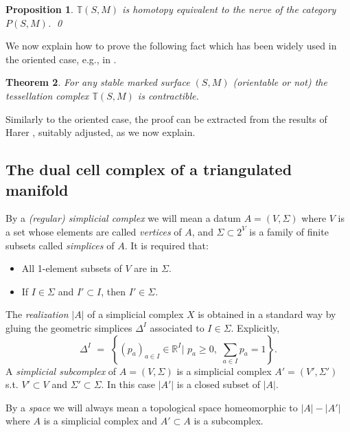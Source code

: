 \documentclass[english,11pt,leqno]{article}
\def\RR{\mathbb{R}}
\def\TT{{\mathbb{T}}}
\newtheorem{thm}{Theorem}[section]
\newtheorem{prop}[thm]{Proposition}
\theoremstyle{definition}
\theoremstyle{remark}
\numberwithin{equation}{section}
\begin{document}
 \begin{prop}\label{prop:tess-graph}
 $\TT(S,M)$ is homotopy equivalent to the nerve of the category $P(S,M)$. 
 \qed
 \end{prop}
 
 We now explain  how to prove the following fact which has been widely used in the oriented case, e.g., in
 \cite {HSS-triangulated, fock-goncharov}. 
 
 \begin{thm}\label{thm:contractible}
	For any stable marked surface $(S,M)$ (orientable or not) the tessellation complex $\TT(S,M)$ is contractible. 
\end{thm}
  
  Similarly to the oriented case, the proof can be extracted from the results of Harer \cite{harer},
  suitably adjusted,  as we now explain. 
 
 
 \subsection {The dual cell complex of a triangulated manifold}
 
 By a {\em (regular) simplicial complex}  we will mean a datum $A=(V,\Sigma)$
 where $V$ is a set whose elements are called {\em vertices} of $A$, and $\Sigma\subset 2^V$
 is a family of finite subsets called {\em simplices} of $A$. It is required that:
 \begin{itemize}
 \item All 1-element subsets of $V$ are in $\Sigma$.
 
 \item If $I\in \Sigma$ and $I'\subset I$, then $I'\in\Sigma$. 
 \end{itemize}
 
 The {\em realization} $|A|$ of a simplicial complex $X$ is obtained in a standard way by
 gluing the geometric simplices $\Delta^I$ associated to $I\in\Sigma$. Explicitly,
 \[
 \Delta^I \,\,=\,\,\left\{ (p_a)_{a\in I}\in\RR^I \bigl| \,\, p_a\geq 0, \,\,\sum_{a\in I} p_a =1\right\}. 
 \]
 A {\em simplicial subcomplex} of $A=(V,\Sigma)$ is a simplicial complex $A'=(V',\Sigma')$
 s.t. $V'\subset V$ and $\Sigma'\subset\Sigma$. In this case $|A'|$ is a closed subset of $|A|$. 
 
 By a {\em space} we will always mean a topological space homeomorphic to $|A|-|A'|$ where
 $A$ is a simplicial complex and $A'\subset A$ is a subcomplex.
 
\end{document}
